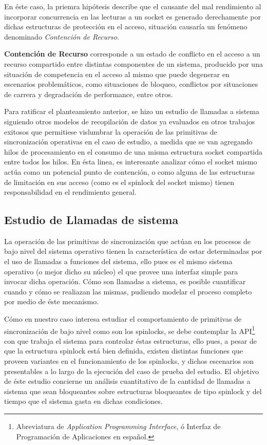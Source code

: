 En éste caso, la priemra hipótesis describe que el causante del mal rendimiento al incorporar concurrencia en las lecturas a un socket es generado derechamente por dichas estructuras de protección en el acceso, situación causaría un fenómeno denominado \emph{Contención de Recurso}.

\begin{defn} \textbf{Contención de Recurso} corresponde a un estado de conflicto en el acceso a un recurso compartido entre distintas componentes de un sistema, producido por una situación de competencia en el acceso al mismo que puede degenerar en escenarios problemáticos, como situaciones de bloqueo, conflictos por situaciones de carrera y degradación de performance, entre otros.
\end{defn}

Para ratificar el planteamiento anterior, se hizo un estudio de llamadas a sistema siguiendo otros modelos de recopilación de datos ya evaluados en otros trabajos exitosos \cite{slides:hpPerf} que permitiese vislumbrar la operación de las primitivas de sincronización operativas en el caso de estudio, a medida que se van agregando hilos de procesamiento en el consumo de una misma estructura socket compartida entre todos los hilos. En ésta linea, es interesante analizar cómo el socket mismo actúa como un potencial punto de contención, o como alguna de las estructuras de limitación en sus acceso (como es el spinlock del socket mismo) tienen responsabilidad en el rendimiento general.

\subsection{Estudio de Llamadas de sistema}

La operación de las primitivas de sincronización que actúan en los procesos de bajo nivel del sistema operativo tienen la característica de estar determinadas por el uso de llamadas a funciones del sistema, ello pues es el mismo sistema operativo (o mejor dicho su núcleo) el que provee una interfaz simple para invocar dicha operación. Cómo son llamadas a sistema, es posible cuantificar cuando y cómo se realiazan las mismas, pudiendo modelar el proceso completo por medio de éste mecanismo.

Cómo en nuestro caso interesa estudiar el comportamiento de primitivas de sincronización de bajo nivel como son los spinlocks, se debe contemplar la API\footnote{Abreviatura de \emph{Application Programming Interface}, ó Interfaz de Programación de Aplicaciones en español.} con que trabaja el sistema para controlar éstas estructuras, ello pues, a pesar de que la estructura spinlock está bien definida, existen distintas funciones que proveen variantes en el funcionamiento de los spinlocks, y dichos escenarios son presentables a lo largo de la ejecución del caso de prueba del estudio. El objetivo de éste estudio concierne un análisis cuantitativo de la cantidad de llamadas a sistema que sean bloqueantes sobre estructuras bloqueantes de tipo spinlock y del tiempo que el sistema gasta en dichas condiciones.

